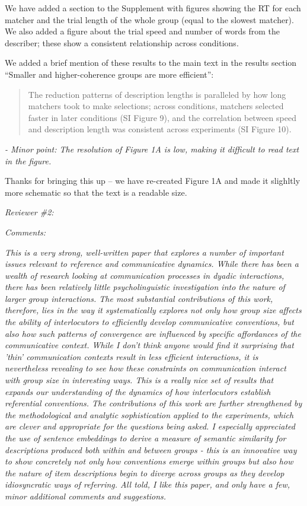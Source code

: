 \documentclass{stanfordletter}
\newcommand{\theysaid}[1]{\begin{leftbar} \noindent 
		\textsl{ #1}\end{leftbar}}
\newcommand{\revised}[1]{\begin{quote}	#1 \end{quote}}
\begin{document}
\begin{letter}{}
          We have added a section to the Supplement with figures showing the RT for each matcher and the trial length of the whole group (equal to the slowest matcher). We also added a figure about the trial speed and number of words from the describer; these show a consistent relationship across conditions. 
          
          We added a brief mention of these results to the main text in the results section ``Smaller and higher-coherence groups are more efficient'':
          
          \revised{The reduction patterns of description lengths is paralleled by how long matchers took to make selections; across conditions, matchers selected faster in later conditions (SI Figure 9), and the correlation between speed and description length was consistent across experiments (SI Figure 10).}
          
          \theysaid{- Minor point: The resolution of Figure 1A is low, making it difficult to read text in the figure.}
          
          Thanks for bringing this up -- we have re-created Figure 1A and made it slighltly more schematic so that the text is a readable size. 
          
          \theysaid{Reviewer \#2:}
          \theysaid{Comments:}
          \theysaid{This is a very strong, well-written paper that explores a number of important issues relevant to reference and communicative dynamics. While there has been a wealth of research looking at communication processes in dyadic interactions, there has been relatively little psycholinguistic investigation into the nature of larger group interactions. The most substantial contributions of this work, therefore, lies in the way it systematically explores not only how group size affects the ability of interlocutors to efficiently develop communicative conventions, but also how such patterns of convergence are influenced by specific affordances of the communicative context. While I don't think anyone would find it surprising that 'thin' communication contexts result in less efficient interactions, it is nevertheless revealing to see how these constraints on communication interact with group size in interesting ways. This is a really nice set of results that expands our understanding of the dynamics of how interlocutors establish referential conventions. The contributions of this work are further strengthened by the methodological and analytic sophistication applied to the experiments, which are clever and appropriate for the questions being asked. I especially appreciated the use of sentence embeddings to derive a measure of semantic similarity for descriptions produced both within and between groups - this is an innovative way to show concretely not only how conventions emerge within groups but also how the nature of item descriptions begin to diverge across groups as they develop idiosyncratic ways of referring. All told, I like this paper, and only have a few, minor additional comments and suggestions.}
          

\end{letter}
\end{document}

